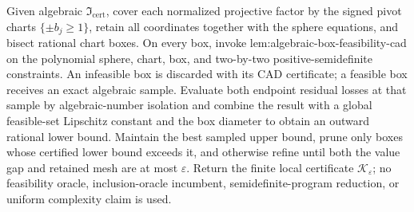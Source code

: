 Given algebraic \(\mathfrak I_{\mathrm{cert}}\), cover each normalized projective factor by the signed pivot charts \(\{\pm b_j\ge1\}\), retain all coordinates together with the sphere equations, and bisect rational chart boxes.  On every box, invoke lem:algebraic-box-feasibility-cad on the polynomial sphere, chart, box, and two-by-two positive-semidefinite constraints.  An infeasible box is discarded with its CAD certificate; a feasible box receives an exact algebraic sample.  Evaluate both endpoint residual losses at that sample by algebraic-number isolation and combine the result with a global feasible-set Lipschitz constant and the box diameter to obtain an outward rational lower bound.  Maintain the best sampled upper bound, prune only boxes whose certified lower bound exceeds it, and otherwise refine until both the value gap and retained mesh are at most \(\varepsilon\).  Return the finite local certificate \(\mathscr K_{\varepsilon}\); no feasibility oracle, inclusion-oracle incumbent, semidefinite-program reduction, or uniform complexity claim is used.